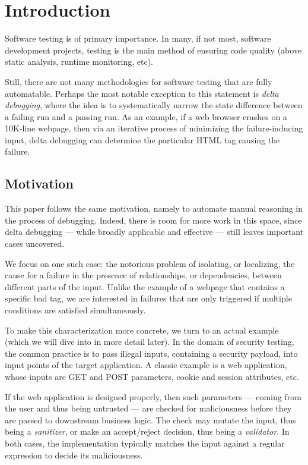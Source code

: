 \section{Introduction}

Software testing is of primary importance. In many, if not most, software development projects, testing is the main method of ensuring code quality (above static analysis, runtime monitoring, etc).

Still, there are not many methodologies for software testing that are fully automatable. Perhaps the most notable exception to this statement is \emph{delta debugging}, where the idea is to systematically narrow the state difference between a failing run and a passing run. As an example, if a 
web browser crashes on a 10K-line webpage, then via an iterative process of minimizing the failure-inducing input, delta debugging can determine the particular HTML tag causing the failure.

\subsection{Motivation} This paper follows the same motivation, namely to automate manual reasoning in the process of debugging. Indeed, there is room for more work in this space, since delta debugging --- while broadly applicable and effective --- still leaves important cases uncovered.

We focus on one such case: the notorious problem of isolating, or localizing, the cause for a failure in the presence of relationships, or dependencies, between different parts of the input. Unlike the example of a webpage that contains a specific bad tag, we are interested in failures that are only triggered if multiple conditions are satisfied simultaneously.

To make this characterization more concrete, we turn to an actual example (which we will dive into in more detail later). In the domain of security testing, the common practice is to pass illegal inputs, containing a security payload, into input points of the target application. A classic example is a web application, whose inputs are GET and POST parameters, cookie and session attributes, etc.

If the web application is designed properly, then such parameters --- coming from the user and thus being untrusted --- are checked for maliciousness before they are passed to downstream business logic. The check may mutate the input, thus being a \emph{sanitizer}, or make an accept/reject decision, thus being a \emph{validator}. In both cases, the implementation typically matches the input against a regular expression to decide its maliciousness.

